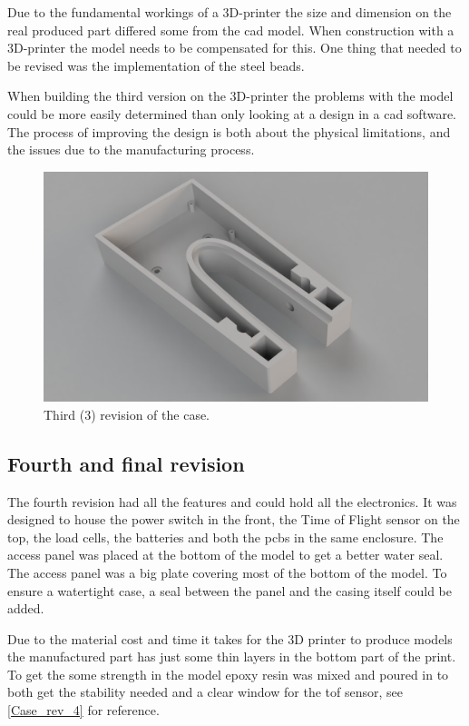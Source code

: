 Due to the fundamental workings of a 3D-printer the size and dimension on the real produced part differed some from the \gls{cad} model. When construction with a 3D-printer the model needs to be compensated for this. One thing that needed to be revised was the implementation of the steel beads.

When building the third version on the 3D-printer the problems with the model could be more easily determined than only looking at a design in a \gls{cad} software. The process of improving the design is both about the physical limitations, and the issues due to the manufacturing process.
\begin{figure}[H]
\begin{center}
	\includegraphics[width = .8\textwidth]{Figures/Case_rev_3.png}
	\caption{Third (3) revision of the case.}
	\label{Case_rev_3}
\end{center}
\end{figure}

\subsection{Fourth and final  revision}
The fourth revision had all the features and could hold all the electronics. It was designed to house the power switch in the front, the Time of Flight sensor on the top, the load cells, the batteries and both the \gls{pcb}s in the same enclosure. The access panel was placed at the bottom of the model to get a better water seal. The access panel was a big plate covering most of the bottom of the model. To ensure a watertight case, a seal between the panel and the casing itself could be added. 

Due to the material cost and time it takes for the 3D printer to produce models the manufactured part has just some thin layers in the bottom part of the print. To get the some strength in the model epoxy resin was mixed and poured in to both get the stability needed and a clear window for the \gls{tof} sensor, see \autoref{Case_rev_4} for reference.

